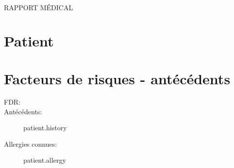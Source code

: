 \documentclass[headlines=6,headinclude=true,10pt]{scrartcl}
\begin{document}
\begin{center}
  \Huge{\textsf{RAPPORT MÉDICAL}}
\end{center}

  \section{Patient}
         \section{Facteurs de risques - antécédents }
      \begin{description}
        
      \item[FDR:]
        
        \begin{itemize}
          {%
            {%
              {%
                {%
                  {%
                    {%
                      
                    \end{itemize}

                  \item[Antécédents:]
                    {{ patient.history }}
                  \item[Allergies connues:] {{ patient.allergy }}
                  \end{description}
\end{document}

